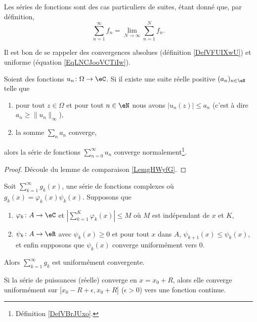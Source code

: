 Les séries de fonctions sont des cas particuliers de suites, étant donné que, par définition,
\begin{equation}
    \sum_{n=1}^{\infty}f_n=\lim_{N\to \infty} \sum_{n=1}^{N}f_n.
\end{equation}

Il est bon de se rappeler des convergences absolues (définition \ref{DefVFUIXwU}) et uniforme (équation \ref{EqLNCJooVCTiIw}).

\begin{lemma}
    Soient des fonctions \( u_n\colon \Omega\to \eC\). Si il existe une suite réelle positive \( (a_n)_{n\in \eN}\) telle que
    \begin{enumerate}
        \item
            pour tout \( z\in \Omega\) et pour tout \( n\in \eN\) nous avons \( | u_n(z) |\leq a_n\) (c'est à dire \( a_n\geq \| u_n \|_{\infty}\)),
        \item
            la somme \( \sum_{n}a_n\) converge,
    \end{enumerate}
    alors la série de fonctions \( \sum_{n=0}^{\infty}u_n\) converge normalement\footnote{Définition \ref{DefVBrJUxo}.}.
\end{lemma}

\begin{proof}
    Découle du lemme de comparaison \ref{LemgHWyfG}.
\end{proof}

\begin{theorem}				\label{ThoSerCritAbel}
	Soit $\sum_{k=1}^{\infty}g_k(x)$, une série de fonctions complexes où $g_k(x)=\varphi_k(x)\psi_k(x)$. Supposons que
	\begin{enumerate}

		\item
			$\varphi_k\colon A\to \eC$ et $| \sum_{k=1}^K\varphi_k(x) |\leq M$ où $M$ est indépendant de $x$ et $K$,
		\item
			$\psi_k\colon A\to \eR$ avec $\psi_k(x)\geq 0$ et pour tout $x$ dans $A$, $\psi_{k+1}(x)\leq \psi_k(x)$, et enfin supposons que $\psi_k(x)$ converge uniformément vers $0$.

	\end{enumerate}
	Alors $\sum_{k=1}^{\infty}g_k$ est uniformément convergente.
\end{theorem}

\begin{theorem}		\label{ThoAbelSeriePuiss}
	Si la série de puissances (réelle) converge en $x=x_0+R$, alors elle converge uniformément sur $\mathopen[ x_0-R+\epsilon , x_0+R \mathclose]$ ($\epsilon>0$) vers une fonction continue.
\end{theorem}


